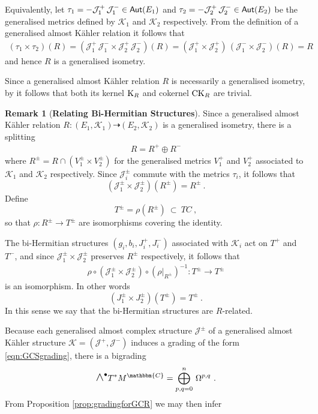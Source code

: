\documentclass[a4paper, reqno, 11pt]{amsart}
\numberwithin{equation}{section}
\theoremstyle{definition}
\newtheorem{remark}[equation]{Remark}
\newcommand{\IC}{\mathbbm{C}}
\newcommand{\cK}{{\mathcal K}}
\newcommand{\cJ}{{\mathcal J}}
\newcommand{\midwedge}{\text {\Large$\wedge$}}
\newcommand{\rel}{\dashrightarrow}
\theoremstyle{remark}
\begin{document}
Equivalently, let $\tau_1=-\cJ_1^+\, \cJ_1^-\in{\sf Aut}(E_1)$ and $\tau_2=-\cJ_2^+ \, \cJ_2^-\in {\sf Aut}(E_2)$ be the generalised metrics  defined by $\cK_1$ and $\cK_2$ respectively. From the definition of a generalised almost K\"ahler relation it follows that
\begin{align}
    (\tau_1 \times \tau_2)(R) = (\cJ_1^+\, \cJ_1^- \times \cJ_2^+ \, \cJ_2^-)(R) = (\cJ_1^+\times\cJ_2^+)\,(\cJ_1^-\times\cJ_2^-)(R) = R
\end{align}
and hence $R$ is a generalised isometry.

Since a generalised almost K\"ahler relation $R$ is necessarily a generalised isometry, by \cite[Proposition 4.17]{DeFraja:2023fhe} it follows that both its kernel ${\rm K}_R $ and cokernel $ {\rm CK}_R$ are trivial.

\begin{remark}[\textbf{Relating Bi-Hermitian Structures}]\label{rem:Bihermitian}
    Since a generalised almost K\"ahler relation $R\colon (E_1, \cK_1) \rel (E_2, \cK_2)$ is a generalised isometry, there is a splitting
    \begin{align}
        R = R^+\oplus R^-
    \end{align}
    where $R^\pm = R\cap(V_1^\pm \times V_2^\pm)$ for the generalised metrics $V_1^+$ and $ V_2^+$ associated to $\cK_1$ and $\cK_2$ respectively. Since $\cJ^\pm_i$ commute with the metrics $\tau_i$, it follows that $$(\cJ_1^\pm \times \cJ_2^\pm)(R^\pm) = R^\pm \ . $$ Define $$T^\pm = \rho(R^\pm) \ \subset \ TC \ , $$ so that $\rho\colon R^\pm \to T^\pm$ are isomorphisms covering the identity. 
    
    The bi-Hermitian structures $(g_i, b_i, J_i^+, J_i^-)$ associated with $\cK_i$ act on $T^+$ and $T^-$, and since $\cJ_1^\pm \times \cJ_2^\pm$ preserves $R^\pm$ respectively, it follows that
    \begin{align}
        \rho \circ (\cJ_1^\pm \times \cJ_2^\pm) \circ (\rho |_{R^\pm})^{-1} \colon T^\pm \longrightarrow T^\pm
    \end{align}
    is an isomorphism. In other words $$(J_1^\pm \times J_2^\pm)(T^\pm) = T^\pm \ . $$ In this sense we say that the bi-Hermitian structures are $R$-related.
\end{remark}

Because each generalised almost complex structure $\cJ^\pm$ of a generalised almost K\"ahler structure $\cK=(\cJ^+,\cJ^-)$ induces a grading of the form \eqref{eqn:GCSgrading}, there is a bigrading
\begin{align}
    \midwedge^\bullet T^*M^\IC = \bigoplus_{p,q=0}^n\, \Omega^{p,q} \ .
\end{align}
From Proposition \ref{prop:gradingforGCR} we may then infer
\end{document}

